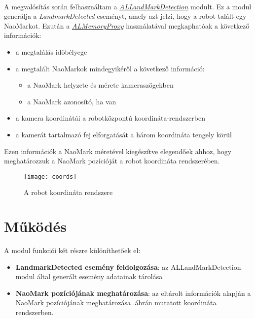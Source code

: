 \documentclass{article}
\numberwithin{figure}{section}
\newcommand{\figref}[1]{\aref{fig:#1}.ábr}
\newenvironment{compactlist}
{ \begin{itemize}
    \setlength{\itemsep}{0pt}
    \setlength{\parskip}{0pt}
    \setlength{\parsep}{0pt}
	\setlength{\topsep}{0pt}
}
{ \end{itemize}}
\begin{document}
\begin{sloppypar}
		\paragraph{}
		A megvalósítás során felhasználtam a \href{http://doc.aldebaran.com/1-14/naoqi/vision/allandmarkdetection.html}{\textit{ALLandMarkDetection}} modult. Ez a modul generálja a \textit{LandmarkDetected} eseményt, amely azt jelzi, hogy a robot talált egy NaoMarkot. Ezután a \href{http://doc.aldebaran.com/1-14/naoqi/core/almemory-api.html?highlight=almemory#ALMemoryProxy}{\textit{ALMemoryProxy}} használatával megkaphatóak a következő információk:
		\begin{compactlist}
			\item a megtalálás időbélyege
			\item a megtalált NaoMarkok mindegyikéről a következő információ:
			\begin{compactlist}
				\item a NaoMark helyzete és mérete kameraszögekben
				\item a NaoMark azonosító, ha van
			\end{compactlist}
			\item a kamera koordinátái a robotközpontú koordináta-rendszerben
			\item a kamerát tartalmazó fej elforgatását a három koordináta tengely körül
		\end{compactlist}\par
		Ezen információk a NaoMark méretével kiegészítve elegendőek ahhoz, hogy meghatározzuk a NaoMark pozícióját a robot koordináta rendszerében.\\
		\begin{wrapfigure}[14]{R}{0\textwidth}
    		\centering
		    \texttt{[image: coords]}
		    \caption{A robot koordináta rendszere}
		    \label{fig:coords}
		\end{wrapfigure}
		\section{Működés}
		\paragraph{}		
		A modul funkciói két részre különíthetőek el: 
		\begin{compactlist}
			\item \textbf{LandmarkDetected esemény feldolgozása}: az ALLandMarkDetection modul által generált esemény adatainak tárolása
			\item \textbf{NaoMark pozíciójának meghatározása}: az eltárolt információk alapján a NaoMark pozíciójának meghatározása \figref{coords}án mutatott koordináta rendszerben.
		\end{compactlist}
		

\end{sloppypar}
\end{document}
